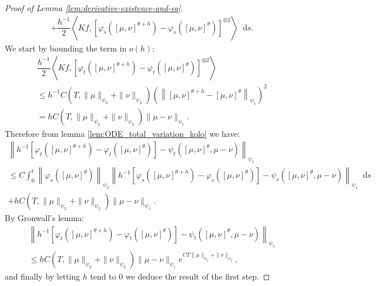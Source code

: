 \documentclass[11pt,a4paper]{article}
\newcommand{\brac}[1]{\left\langle#1\right\rangle}
\newcommand{\dd}{\mathop{}\!\mathrm{d}}
\begin{document}
\begin{proof}[Proof of Lemma \ref{lem:derivative-existence-and-eq}]
\begin{multline*}
        + \dfrac{h^{-1}}{2}\brac{Kf, \left[\varphi_s\left(\left[\mu,\nu \right]^{\theta+h} \right) - \varphi_s\left(\left[\mu,\nu \right]^{\theta} \right)\right]^{\otimes 2}} \dd s.
    \end{multline*}
    We start by bounding the term in $o(h)$:
    \begin{multline*}
        \dfrac{h^{-1}}{2}\brac{Kf, \left[\varphi_t\left(\left[\mu,\nu \right]^{\theta+h} \right) - \varphi_t\left(\left[\mu,\nu \right]^{\theta} \right)\right]^{\otimes 2}} \\
        \leq h^{-1}C\left(T,\|\mu\|_{\psi_2} + \|\nu\|_{\psi_2}\right)\left(\left\| \left[\mu,\nu \right]^{\theta+h} - \left[\mu,\nu \right]^{\theta}\right\|_{\psi_1}\right)^2\\
        = hC\left(T,\|\mu\|_{\psi_2} + \|\nu\|_{\psi_2}\right)\|\mu - \nu\|_{\psi_1}.
    \end{multline*}
    Therefore from lemma \ref{lem:ODE_total_variation_kolo} we have:
    \begin{multline*}
        \left\| h^{-1}\left[\varphi_t\left(\left[\mu,\nu \right]^{\theta+h} \right) - \varphi_t\left(\left[\mu,\nu \right]^{\theta} \right) \right] - \psi_t\left(\left[\mu,\nu \right]^\theta,\mu-\nu\right)\right\|_{\psi_1} \\
        \leq C\int_0^t \left\| \varphi_s\left(\left[\mu,\nu \right]^{\theta} \right) \right\|_{\psi_2}\left\| h^{-1}\left[\varphi_s\left(\left[\mu,\nu \right]^{\theta+h} \right) - \varphi_s\left(\left[\mu,\nu \right]^{\theta} \right) \right] - \psi_s\left(\left[\mu,\nu \right]^\theta,\mu-\nu\right)\right\|_{\psi_1} \dd s\\
        + hC\left(T,\|\mu\|_{\psi_2} + \|\nu\|_{\psi_2}\right)\|\mu - \nu\|_{\psi_1}.
    \end{multline*}
    By Gronwall's lemma:
    \begin{multline*}
        \left\| h^{-1}\left[\varphi_t\left(\left[\mu,\nu \right]^{\theta+h} \right) - \varphi_t\left(\left[\mu,\nu \right]^{\theta} \right) \right] - \psi_t\left(\left[\mu,\nu \right]^\theta,\mu-\nu\right)\right\|_{\psi_1} \\
        \leq hC\left(T,\|\mu\|_{\psi_2} + \|\nu\|_{\psi_2}\right)\|\mu - \nu\|_{\psi_1} e^{CT\|\mu\|_{\psi_2} + \|\nu\|_{\psi_2}},
    \end{multline*}
    and finally by letting $h$ tend to $0$ we deduce the result of the first step.
    

\end{proof}
\end{document}
